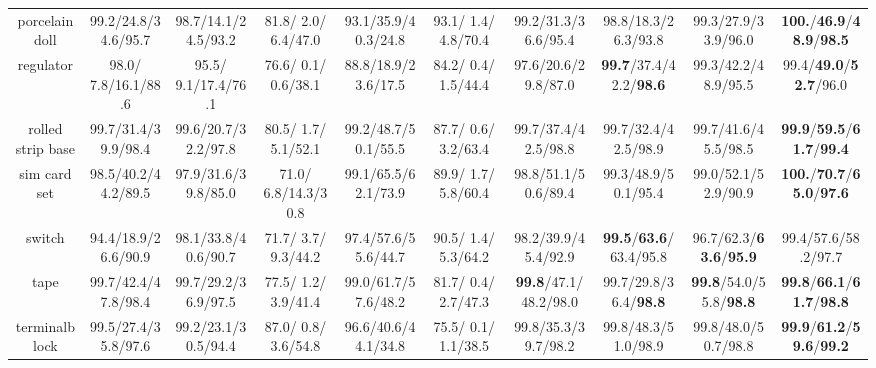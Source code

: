 \documentclass{article}
\theoremstyle{plain}
\theoremstyle{definition}
\theoremstyle{remark}
\begin{document}
\begin{table}[p]
{\begin{tabular}{ccccccccc>{\columncolor{oursblue}}c}
porcelain doll   & 99.2/24.8/34.6/95.7 & 98.7/14.1/24.5/93.2 & 81.8/ 2.0/ 6.4/47.0 & 93.1/35.9/40.3/24.8 & 93.1/ 1.4/ 4.8/70.4 & 99.2/31.3/36.6/95.4 & 98.8/18.3/26.3/93.8 & 99.3/27.9/33.9/96.0 & \textbf{100.}/\textbf{46.9}/\textbf{48.9}/\textbf{98.5} \\
\cellcolor{rowgray} regulator & \cellcolor{rowgray} 98.0/ 7.8/16.1/88.6 & \cellcolor{rowgray} 95.5/ 9.1/17.4/76.1 & \cellcolor{rowgray} 76.6/ 0.1/ 0.6/38.1 & \cellcolor{rowgray} 88.8/18.9/23.6/17.5 & \cellcolor{rowgray} 84.2/ 0.4/ 1.5/44.4 & \cellcolor{rowgray} 97.6/20.6/29.8/87.0 & \cellcolor{rowgray} \textbf{99.7}/37.4/42.2/\textbf{98.6} & \cellcolor{rowgray} 99.3/42.2/48.9/95.5 & 99.4/\textbf{49.0}/\textbf{52.7}/96.0 \\
rolled strip base& 99.7/31.4/39.9/98.4 & 99.6/20.7/32.2/97.8 & 80.5/ 1.7/ 5.1/52.1 & 99.2/48.7/50.1/55.5 & 87.7/ 0.6/ 3.2/63.4 & 99.7/37.4/42.5/98.8 & 99.7/32.4/42.5/98.9 & 99.7/41.6/45.5/98.5 & \textbf{99.9}/\textbf{59.5}/\textbf{61.7}/\textbf{99.4} \\
\cellcolor{rowgray} sim card set & \cellcolor{rowgray} 98.5/40.2/44.2/89.5 & \cellcolor{rowgray} 97.9/31.6/39.8/85.0 & \cellcolor{rowgray} 71.0/ 6.8/14.3/30.8 & \cellcolor{rowgray} 99.1/65.5/62.1/73.9 & \cellcolor{rowgray} 89.9/ 1.7/ 5.8/60.4 & \cellcolor{rowgray} 98.8/51.1/50.6/89.4 & \cellcolor{rowgray} 99.3/48.9/50.1/95.4 & \cellcolor{rowgray} 99.0/52.1/52.9/90.9 & \textbf{100.}/\textbf{70.7}/\textbf{65.0}/\textbf{97.6} \\
switch           & 94.4/18.9/26.6/90.9 & 98.1/33.8/40.6/90.7 & 71.7/ 3.7/ 9.3/44.2 & 97.4/57.6/55.6/44.7 & 90.5/ 1.4/ 5.3/64.2 & 98.2/39.9/45.4/92.9 & \textbf{99.5}/\textbf{63.6}/63.4/95.8 & 96.7/62.3/\textbf{63.6}/\textbf{95.9} & 99.4/57.6/58.2/97.7 \\
\cellcolor{rowgray} tape & \cellcolor{rowgray} 99.7/42.4/47.8/98.4 & \cellcolor{rowgray} 99.7/29.2/36.9/97.5 & \cellcolor{rowgray} 77.5/ 1.2/ 3.9/41.4 & \cellcolor{rowgray} 99.0/61.7/57.6/48.2 & \cellcolor{rowgray} 81.7/ 0.4/ 2.7/47.3 & \cellcolor{rowgray} \textbf{99.8}/47.1/48.2/98.0 & \cellcolor{rowgray} 99.7/29.8/36.4/\textbf{98.8} & \cellcolor{rowgray} \textbf{99.8}/54.0/55.8/\textbf{98.8} & \textbf{99.8}/\textbf{66.1}/\textbf{61.7}/\textbf{98.8} \\
terminalblock    & 99.5/27.4/35.8/97.6 & 99.2/23.1/30.5/94.4 & 87.0/ 0.8/ 3.6/54.8 & 96.6/40.6/44.1/34.8 & 75.5/ 0.1/ 1.1/38.5 & 99.8/35.3/39.7/98.2 & 99.8/48.3/51.0/98.9 & 99.8/48.0/50.7/98.8 & \textbf{99.9}/\textbf{61.2}/\textbf{59.6}/\textbf{99.2} \\

\end{tabular}}
\end{table}
\end{document}
